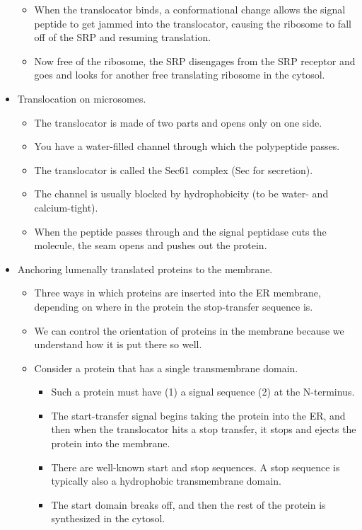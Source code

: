 \documentclass[../notes.tex]{subfiles}
\begin{document}
\begin{itemize}
\begin{itemize}
        \item When the translocator binds, a conformational change allows the signal peptide to get jammed into the translocator, causing the ribosome to fall off of the SRP and resuming translation.
        \item Now free of the ribosome, the SRP disengages from the SRP receptor and goes and looks for another free translating ribosome in the cytosol.
    \end{itemize}
    \item Translocation on microsomes.
    \begin{itemize}
        \item The translocator is made of two parts and opens only on one side.
        \item You have a water-filled channel through which the polypeptide passes.
        \item The translocator is called the Sec61 complex (Sec for secretion).
        \item The channel is usually blocked by hydrophobicity (to be water- and calcium-tight).
        \item When the peptide passes through and the signal peptidase cuts the molecule, the seam opens and pushes out the protein.
    \end{itemize}
    \item Anchoring lumenally translated proteins to the membrane.
    \begin{itemize}
        \item Three ways in which proteins are inserted into the ER membrane, depending on where in the protein the stop-transfer sequence is.
        \item We can control the orientation of proteins in the membrane because we understand how it is put there so well.
        \item Consider a protein that has a single transmembrane domain.
        \begin{itemize}
            \item Such a protein must have (1) a signal sequence (2) at the N-terminus.
            \item The start-transfer signal begins taking the protein into the ER, and then when the translocator hits a stop transfer, it stops and ejects the protein into the membrane.
            \item There are well-known start and stop sequences. A stop sequence is typically also a hydrophobic transmembrane domain.
            \item The start domain breaks off, and then the rest of the protein is synthesized in the cytosol.

\end{itemize}
\end{itemize}
\end{itemize}
\end{document}
